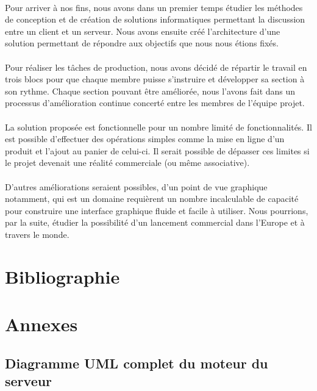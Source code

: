 \documentclass[a4paper, 12pt]{article}
\begin{document}
\paragraph{}Pour arriver à nos fins, nous avons dans un premier temps étudier les méthodes de conception et de création de solutions informatiques permettant la discussion entre un client et un serveur. Nous avons ensuite créé l’architecture d’une solution permettant de répondre aux objectifs que nous nous étions fixés.
\paragraph{}Pour réaliser les tâches de production, nous avons décidé de répartir le travail en trois blocs pour que chaque membre puisse s'instruire et développer sa section à son rythme. Chaque section pouvant être améliorée, nous l’avons fait dans un processus d’amélioration continue concerté entre les membres de l’équipe projet.
\paragraph{}La solution proposée est fonctionnelle pour un nombre limité de fonctionnalités. Il est possible d'effectuer des opérations simples comme la mise en ligne d’un produit et l’ajout au panier de celui-ci. Il serait possible de dépasser ces limites si le projet devenait une réalité commerciale (ou même associative).
\paragraph{}D’autres améliorations seraient possibles, d’un point de vue graphique notamment, qui est un domaine requièrent un nombre incalculable de capacité pour construire une interface graphique fluide et facile à utiliser. Nous pourrions, par la suite, étudier la possibilité d’un lancement commercial dans l’Europe et à travers le monde.


\newpage
\section{Bibliographie}



\newpage
\section*{Annexes}
\subsection*{Diagramme UML complet du moteur du serveur}
\end{document}

